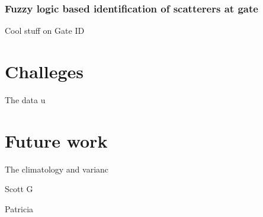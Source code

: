 \documentclass[twocol]{ametsoc}
\begin{document}
\subsubsection{Fuzzy logic based identification of scatterers at gate}
Cool stuff on Gate ID \cite{gourley_fuzzy_2007}


\section{Challeges}
The data u

\section{Future work}
The climatology and varianc


\acknowledgments{}

Scott G

Patricia

%
%
%






\end{document}
